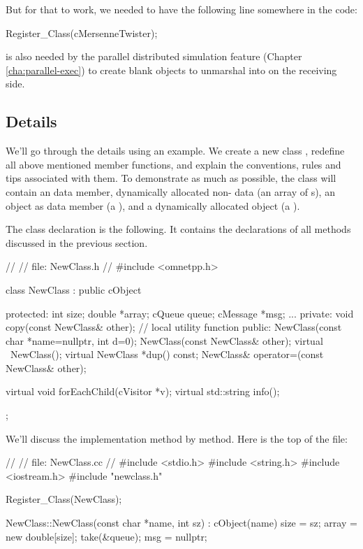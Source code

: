 But for that to work, we needed to have the following line somewhere in the code:

\begin{cpp}
Register_Class(cMersenneTwister);
\end{cpp}

 is also needed by the parallel distributed simulation feature
(Chapter \ref{cha:parallel-exec}) to create blank objects to unmarshal into
on the receiving side.


\subsection{Details}
\label{sec:sim-lib:subclassing-cobject-details}

We'll go through the details using an example. We create a new
class , redefine all above mentioned 
member functions, and explain the conventions, rules and tips
associated with them.
To demonstrate as much as possible, the class will contain
an  data member, dynamically allocated non- data
(an array of s),
an {\opp} object as data member (a ), and
a dynamically allocated {\opp} object (a ).

The class declaration is the following. It contains the declarations
of all methods discussed in the previous section.

\begin{cpp}
//
// file: NewClass.h
//
#include <omnetpp.h>

class NewClass : public cObject
{
  protected:
    int size;
    double *array;
    cQueue queue;
    cMessage *msg;
    ...
  private:
    void copy(const NewClass& other); // local utility function
  public:
    NewClass(const char *name=nullptr, int d=0);
    NewClass(const NewClass& other);
    virtual ~NewClass();
    virtual NewClass *dup() const;
    NewClass& operator=(const NewClass& other);

    virtual void forEachChild(cVisitor *v);
    virtual std::string info();
};
\end{cpp}

We'll discuss the implementation method by method.
Here is the top of the  file:

\begin{cpp}
//
// file: NewClass.cc
//
#include <stdio.h>
#include <string.h>
#include <iostream.h>
#include "newclass.h"

Register_Class(NewClass);

NewClass::NewClass(const char *name, int sz) : cObject(name)
{
    size = sz;
    array = new double[size];
    take(&queue);
    msg = nullptr;
}
\end{cpp}

